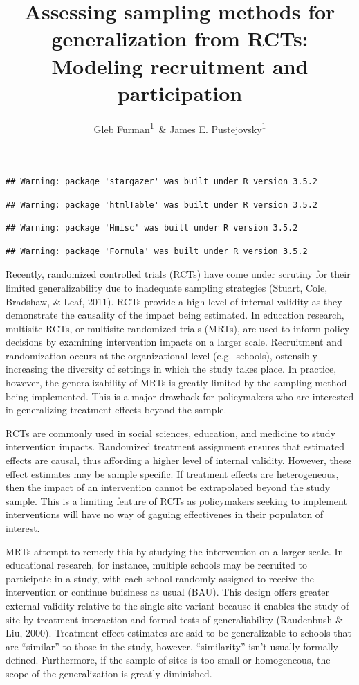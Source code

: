 \documentclass[man,floatsintext]{apa6}
\title{Assessing sampling methods for generalization from RCTs: Modeling
recruitment and participation}
\author{Gleb Furman\textsuperscript{1}~\& James E.
Pustejovsky\textsuperscript{1}}
\date{}
\affiliation{
\vspace{0.5cm}
\textsuperscript{1} University of Texas at Austin}
\theoremstyle{definition}
\theoremstyle{definition}
\theoremstyle{definition}
\theoremstyle{remark}
\begin{document}
\maketitle

\begin{verbatim}
## Warning: package 'stargazer' was built under R version 3.5.2
\end{verbatim}

\begin{verbatim}
## Warning: package 'htmlTable' was built under R version 3.5.2
\end{verbatim}

\begin{verbatim}
## Warning: package 'Hmisc' was built under R version 3.5.2
\end{verbatim}

\begin{verbatim}
## Warning: package 'Formula' was built under R version 3.5.2
\end{verbatim}

Recently, randomized controlled trials (RCTs) have come under scrutiny
for their limited generalizability due to inadequate sampling strategies
(Stuart, Cole, Bradshaw, \& Leaf, 2011). RCTs provide a high level of
internal validity as they demonstrate the causality of the impact being
estimated. In education research, multisite RCTs, or multisite
randomized trials (MRTs), are used to inform policy decisions by
examining intervention impacts on a larger scale. Recruitment and
randomization occurs at the organizational level (e.g.~schools),
ostensibly increasing the diversity of settings in which the study takes
place. In practice, however, the generalizability of MRTs is greatly
limited by the sampling method being implemented. This is a major
drawback for policymakers who are interested in generalizing treatment
effects beyond the sample.

RCTs are commonly used in social sciences, education, and medicine to
study intervention impacts. Randomized treatment assignment ensures that
estimated effects are causal, thus affording a higher level of internal
validity. However, these effect estimates may be sample specific. If
treatment effects are heterogeneous, then the impact of an intervention
cannot be extrapolated beyond the study sample. This is a limiting
feature of RCTs as policymakers seeking to implement interventions will
have no way of gaguing effectivenes in their populaton of interest.

MRTs attempt to remedy this by studying the intervention on a larger
scale. In educational research, for instance, multiple schools may be
recruited to participate in a study, with each school randomly assigned
to receive the intervention or continue buisiness as usual (BAU). This
design offers greater external validity relative to the single-site
variant because it enables the study of site-by-treatment interaction
and formal tests of generaliability (Raudenbush \& Liu, 2000). Treatment
effect estimates are said to be generalizable to schools that are
\enquote{similar} to those in the study, however, \enquote{similarity}
isn't usually formally defined. Furthermore, if the sample of sites is
too small or homogeneous, the scope of the generalization is greatly
diminished.
\end{document}
